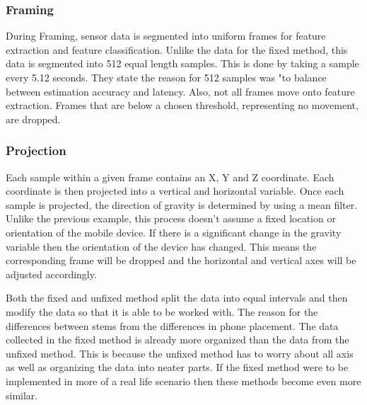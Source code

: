 \documentclass{sig-alternate}
\begin{document}
\subsubsection{Framing}{
 During Framing, sensor data is segmented into uniform frames for feature extraction and feature classification. Unlike the data for the fixed method, this data is segmented into 512 equal length samples. This is done by taking a sample every 5.12 seconds. They state the reason for 512 samples was "to balance between estimation accuracy and latency. Also, not all frames move onto feature extraction. Frames that are below a chosen threshold, representing no movement, are dropped. 
 }
\subsubsection{Projection}{
Each sample within a given frame contains an X, Y and Z coordinate. Each coordinate is then projected into a vertical and horizontal variable. Once each sample is projected, the direction of gravity is determined by using a mean filter. Unlike the previous example, this process doesn't assume a fixed location or orientation of the mobile device. If there is a significant change in the gravity variable then the orientation of the device has changed. This means the corresponding frame will be dropped and the horizontal and vertical axes will be adjusted accordingly. 
}

Both the fixed and unfixed method split the data into equal intervals and then modify the data so that it is able to be worked with. The reason for the differences between stems from the differences in phone placement. The data collected in the fixed method is already more organized than the data from the unfixed method. This is because the unfixed method has to worry about all axis as well as organizing the data into neater parts. If the fixed method were to be implemented in more of a real life scenario then these methods become even more similar. 
\end{document}

